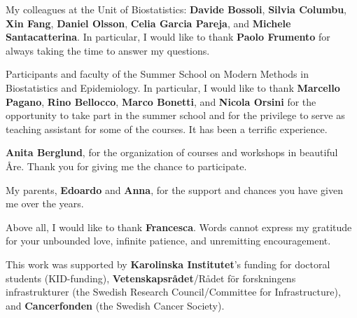 \bigskip

My colleagues at the Unit of Biostatistics: \textbf{Davide Bossoli}, \textbf{Silvia Columbu}, \textbf{Xin Fang}, \textbf{Daniel Olsson}, \textbf{Celia Garcia Pareja}, and \textbf{Michele Santacatterina}. In particular, I would like to thank \textbf{Paolo Frumento} for always taking the time to answer my questions.

\bigskip

Participants and faculty of the Summer School on Modern Methods in Biostatistics and Epidemiology. In particular, I would like to thank \textbf{Marcello Pagano}, \textbf{Rino Bellocco}, \textbf{Marco Bonetti}, and \textbf{Nicola Orsini} for the opportunity to take part in the summer school and for the privilege to serve as teaching assistant for some of the courses. It has been a terrific experience.

\bigskip

\textbf{Anita Berglund}, for the organization of courses and workshops in beautiful Åre. Thank you for giving me the chance to participate. 

\bigskip

My parents, \textbf{Edoardo} and \textbf{Anna}, for the support and chances you have given me over the years.  

\bigskip

Above all, I would like to thank \textbf{Francesca}. Words cannot express my gratitude for your unbounded love, infinite patience, and unremitting encouragement. 

\vfill

\noindent This work was supported by \textbf{Karolinska Institutet}'s funding for doctoral students (\mbox{KID-funding}), \textbf{Vetenskapsrådet}/Rådet för forskningens infrastrukturer (the Swedish Research Council/Committee for Infrastructure), and \textbf{Cancerfonden} (the Swedish Cancer Society).






